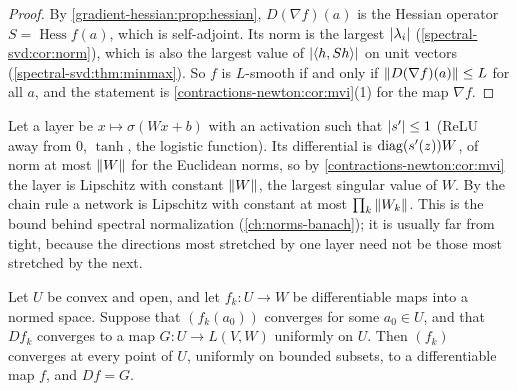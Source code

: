 \begin{notechapter}
\begin{proof}
By \cref{gradient-hessian:prop:hessian}, $D(\nabla f)(a)$ is the Hessian
operator $S = \operatorname{Hess}f(a)$, which is self-adjoint. Its norm is
the largest $\left|\lambda_i\right|$ (\cref{spectral-svd:cor:norm}), which is
also the largest value of $\left|\left\langle h, Sh \right\rangle\right|$ on unit vectors
(\cref{spectral-svd:thm:minmax}). So $f$ is $L$-smooth if and only if
$\left\|D(\nabla f)(a)\right\|\leq L$ for all $a$, and the statement is
\cref{contractions-newton:cor:mvi}(1) for the map $\nabla f$.
\end{proof}

\begin{mlthread}
Let a layer be $x\mapsto\sigma(Wx + b)$ with an activation such that
$\left|s'\right|\leq1$ (ReLU away from $0$, $\tanh$, the logistic function). Its
differential is $\operatorname{diag}(s'(z))W$, of norm at most $\left\|W\right\|$ for the
Euclidean norms, so by \cref{contractions-newton:cor:mvi} the layer is
Lipschitz with constant $\left\|W\right\|$, the largest singular value of $W$. By
the chain rule a network is Lipschitz with constant at most
$\prod_k\left\|W_k\right\|$. This is the bound behind spectral normalization
(\cref{ch:norms-banach}); it is usually far from tight, because the
directions most stretched by one layer need not be those most stretched by
the next.
\end{mlthread}

\begin{theorem}\label{contractions-newton:thm:limit}
Let $U$ be convex and open, and let $f_k:U\to W$ be differentiable maps
into a normed space. Suppose that $(f_k(a_0))$ converges for some
$a_0\in U$, and that $Df_k$ converges to a map $G:U\to L(V, W)$ uniformly
on $U$. Then $(f_k)$ converges at every point of $U$, uniformly on bounded
subsets, to a differentiable map $f$, and $Df = G$.
\end{theorem}


\end{notechapter}
